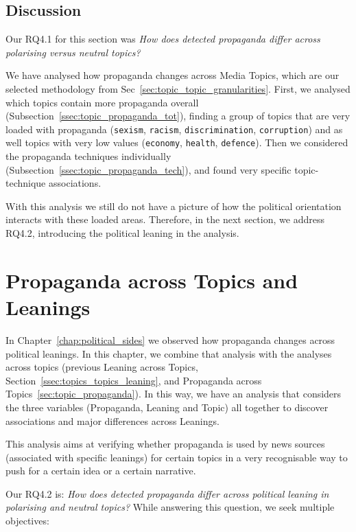 \subsection{\statusgreen Discussion}

Our RQ4.1 for this section was \emph{How does detected propaganda differ across polarising versus neutral topics?}

We have analysed how propaganda changes across Media Topics, which are our selected methodology from Sec~\ref{sec:topic_topic_granularities}.
First, we analysed which topics contain more propaganda overall (Subsection~\ref{ssec:topic_propaganda_tot}), finding a group of topics that are very loaded with propaganda (\texttt{sexism}, \texttt{racism}, \texttt{discrimination}, \texttt{corruption}) and as well topics with very low values (\texttt{economy}, \texttt{health}, \texttt{defence}).
Then we considered the propaganda techniques individually (Subsection~\ref{ssec:topic_propaganda_tech}), and found very specific topic-technique associations.

With this analysis we still do not have a picture of how the political orientation interacts with these loaded areas. Therefore, in the next section, we address RQ4.2, introducing the political leaning in the analysis.



\section{\statusgreen Propaganda across Topics and Leanings}
\label{sec:topic_propaganda_leaning}

In Chapter~\ref{chap:political_sides} we observed how propaganda changes across political leanings.
In this chapter, we combine that analysis with the analyses across topics (previous Leaning across Topics, Section~\ref{ssec:topics_topics_leaning}, and Propaganda across Topics~\ref{sec:topic_propaganda}).
In this way, we have an analysis that considers the three variables (Propaganda, Leaning and Topic) all together to discover associations and major differences across Leanings.

This analysis aims at verifying whether propaganda is used by news sources (associated with specific leanings) for certain topics in a very recognisable way to push for a certain idea or a certain narrative.

Our RQ4.2 is: \emph{How does detected propaganda differ across political leaning in polarising and neutral topics?}
While answering this question, we seek multiple objectives:

